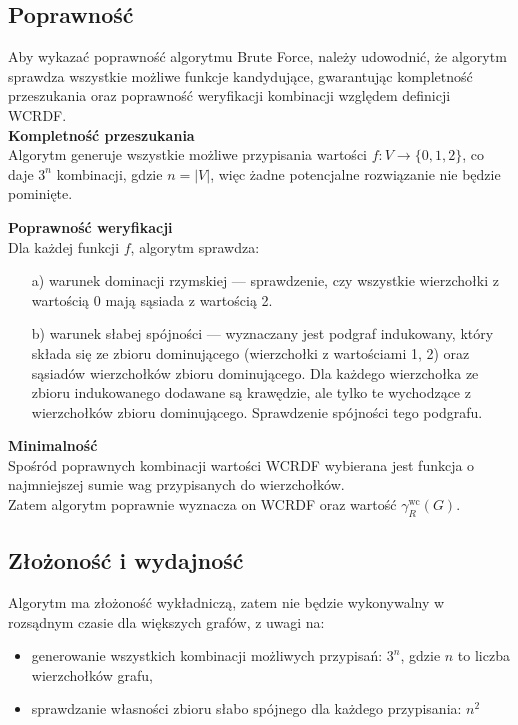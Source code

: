 \subsection{Poprawność}
\label{subsec:bf_poprawnosc}

Aby wykazać poprawność algorytmu Brute Force, należy udowodnić, że algorytm sprawdza wszystkie możliwe funkcje kandydujące, gwarantując kompletność przeszukania oraz poprawność weryfikacji kombinacji względem definicji WCRDF.\\

\textbf{Kompletność przeszukania}\\
Algorytm generuje wszystkie możliwe przypisania wartości $f: V \to \{0,1,2\}$, co daje $3^n$ kombinacji, gdzie $n = |V|$, więc żadne potencjalne rozwiązanie nie będzie pominięte.

\textbf{Poprawność weryfikacji}\\
Dla każdej funkcji $f$, algorytm sprawdza:

\begin{itemize}
    \item[a)] warunek dominacji rzymskiej — sprawdzenie, czy wszystkie wierzchołki z wartością 0 mają sąsiada z wartością 2.
    
    \item[b)] warunek słabej spójności — wyznaczany jest podgraf indukowany, który składa się ze zbioru dominującego (wierzchołki z wartościami {1, 2}) oraz sąsiadów wierzchołków zbioru dominującego. Dla każdego wierzchołka ze zbioru indukowanego dodawane są krawędzie, ale tylko te wychodzące z wierzchołków zbioru dominującego. Sprawdzenie spójności tego podgrafu.
\end{itemize}

\textbf{Minimalność}\\
Spośród poprawnych kombinacji wartości WCRDF wybierana jest funkcja o najmniejszej sumie wag przypisanych do wierzchołków.\\

Zatem algorytm poprawnie wyznacza on WCRDF oraz wartość $\gamma^{\text{wc}}_R(G)$.

\subsection{Złożoność i wydajność}

Algorytm ma złożoność wykładniczą, zatem nie będzie wykonywalny w rozsądnym czasie dla większych grafów, z uwagi na:
\begin{itemize}
    \item generowanie wszystkich kombinacji możliwych przypisań: $3^n$, gdzie $n$ to liczba wierzchołków grafu,
    \item sprawdzanie własności zbioru słabo spójnego dla każdego przypisania: $n^2$
\end{itemize}

